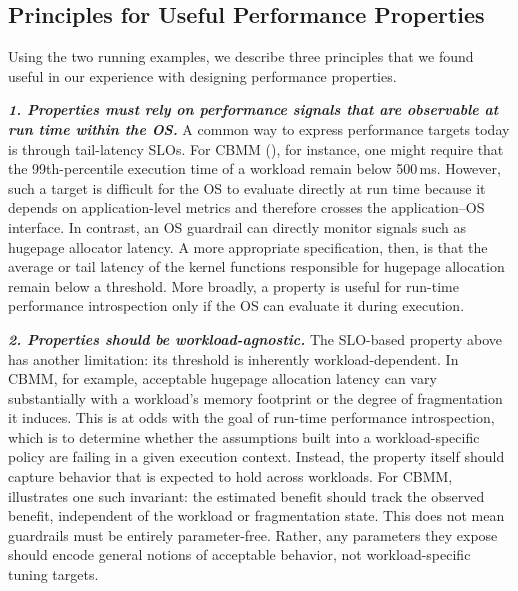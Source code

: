 \subsection{Principles for Useful Performance Properties}
\label{subsec:property-principles}

Using the two running examples, we describe three principles that we found useful in our experience with designing performance properties.

\medskip\noindent
{\em \textbf{1. Properties must rely on performance signals that are observable at run time within the OS.}} 
A common way to express performance targets today is through tail-latency SLOs. For CBMM (), for instance, one might require that the 99th-percentile execution time of a workload remain below 500\,ms. However, such a target is difficult for the OS to evaluate directly at run time because it depends on application-level metrics and therefore crosses the application--OS interface. In contrast, an OS guardrail can directly monitor signals such as hugepage allocator latency. A more appropriate specification, then, is that the average or tail latency of the kernel functions responsible for hugepage allocation remain below a threshold. More broadly, a property is useful for run-time performance introspection only if the OS can evaluate it during execution.

\medskip\noindent
{\em \textbf{2. Properties should be workload-agnostic.}}
The SLO-based property above has another limitation: its threshold is inherently workload-dependent. In CBMM, for example, acceptable hugepage allocation latency can vary substantially with a workload's memory footprint or the degree of fragmentation it induces. This is at odds with the goal of run-time performance introspection, which is to determine whether the assumptions built into a workload-specific policy are failing in a given execution context. Instead, the property itself should capture behavior that is expected to hold across workloads. For CBMM,  illustrates one such invariant: the estimated benefit should track the observed benefit, independent of the workload or fragmentation state. This does not mean guardrails must be entirely parameter-free. Rather, any parameters they expose should encode general notions of acceptable behavior, not workload-specific tuning targets. 

